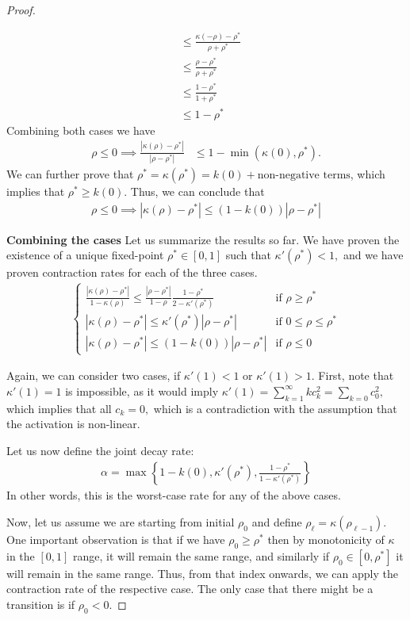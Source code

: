 \documentclass[twoside]{article}
\theoremstyle{definition}
\begin{document}
\begin{proof}
\begin{itemize}
\begin{align*}
&\le \frac{\kappa(-\rho)-\rho^*}{\rho+\rho^*} \\
&\le \frac{\rho-\rho^*}{\rho+\rho^*} \\
&\le \frac{1-\rho^*}{1+\rho^*} \\
&\le 1-\rho^*
\end{align*} 
Combining both cases we have 
\begin{align*}
\rho \le 0 \implies \frac{|\kappa(\rho)-\rho^*|}{|\rho-\rho^*|} &\le 1-\min(\kappa(0),\rho^*).
\end{align*}
We can further prove that $\rho^* = \kappa(\rho^*) = k(0) + \text{non-negative terms}$, which implies that $\rho^* \ge k(0)$. Thus, we can conclude that 
\begin{align*}
\rho \le 0 \implies |\kappa(\rho)-\rho^*| \le (1 - k(0))|\rho-\rho^*|
\end{align*}
\end{itemize}



\textbf{Combining the cases}
Let us summarize the results so far. We have proven the existence of a unique fixed-point $\rho^*\in[0,1]$ such that $\kappa'(\rho^*)< 1,$ and we have proven contraction rates for each of the three cases.
\begin{align*}
\begin{cases}
\frac{|\kappa(\rho)-\rho^*|}{1-\kappa(\rho)} \le \frac{|\rho-\rho^*|}{1-\rho}\frac{1-\rho^*}{2-\kappa'(\rho^*)} & \text{if } \rho \ge \rho^* \\
|\kappa(\rho)-\rho^*| \le \kappa'(\rho^*)|\rho-\rho^*| & \text{if } 0 \le \rho \le \rho^*\\
|\kappa(\rho)-\rho^*| \le (1 - k(0))|\rho-\rho^*| & \text{if } \rho \le 0 
\end{cases}
\end{align*}

Again, we can consider two cases, if $\kappa'(1)<1$ or $\kappa'(1)>1.$ First, note that $\kappa'(1)=1$ is impossible, as it would imply $\kappa'(1)=\sum_{k=1}^\infty k c_k^2 = \sum_{k=0}c_0^2 ,$ which implies that all $c_k=0,$ which is a contradiction with the assumption that the activation is non-linear.

Let us now define the joint decay rate:
\begin{align*}
\alpha = \max\left\{1 - k(0), \kappa'(\rho^*), \frac{1-\rho^*}{1-\kappa'(\rho^*)}\right\}
\end{align*}
In other words, this is the worst-case rate for any of the above cases. 

Now, let us assume we are starting from initial $\rho_0$ and define $\rho_\ell = \kappa(\rho_{\ell-1})$. One important observation is that if we have $\rho_0 \ge \rho^*$ then by monotonicity of $\kappa$ in the $[0,1]$ range, it will remain the same range, and similarly if $\rho_0\in[0,\rho^*]$ it will remain in the same range. Thus, from that index onwards, we can apply the contraction rate of the respective case. The only case that there might be a transition is if $\rho_0 < 0$. 


\end{proof}
\end{document}
